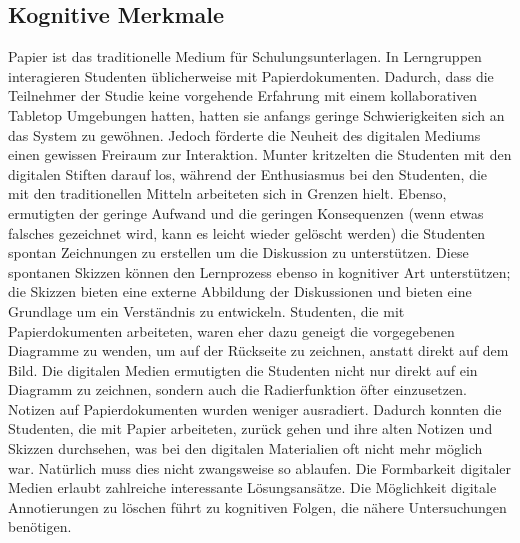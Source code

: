 \subsection{Kognitive Merkmale}
Papier ist das traditionelle Medium für Schulungsunterlagen. In Lerngruppen interagieren Studenten üblicherweise mit Papierdokumenten. Dadurch, dass die Teilnehmer der Studie keine vorgehende Erfahrung mit einem kollaborativen Tabletop Umgebungen hatten, hatten sie anfangs geringe Schwierigkeiten sich an das System zu gewöhnen. Jedoch förderte die Neuheit des digitalen Mediums einen gewissen Freiraum zur Interaktion. Munter kritzelten die Studenten mit den digitalen Stiften darauf los, während der Enthusiasmus bei den Studenten, die mit den traditionellen Mitteln arbeiteten sich in Grenzen hielt. Ebenso, ermutigten der geringe Aufwand und die geringen Konsequenzen (wenn etwas falsches gezeichnet wird, kann es leicht wieder gelöscht werden) die Studenten spontan Zeichnungen zu erstellen um die Diskussion zu unterstützen. Diese spontanen Skizzen können den Lernprozess ebenso in kognitiver Art unterstützen; die Skizzen bieten eine externe Abbildung der Diskussionen und bieten eine Grundlage um ein Verständnis zu entwickeln. Studenten, die mit Papierdokumenten arbeiteten, waren eher dazu geneigt die vorgegebenen Diagramme zu wenden, um auf der Rückseite zu zeichnen, anstatt direkt auf dem Bild. Die digitalen Medien ermutigten die Studenten nicht nur direkt auf ein Diagramm zu zeichnen, sondern auch die Radierfunktion öfter einzusetzen. Notizen auf Papierdokumenten wurden weniger ausradiert. Dadurch konnten die Studenten, die mit Papier arbeiteten, zurück gehen und ihre alten Notizen und Skizzen durchsehen, was bei den digitalen Materialien oft nicht mehr möglich war. Natürlich muss dies nicht zwangsweise so ablaufen. Die Formbarkeit digitaler Medien erlaubt zahlreiche interessante Lösungsansätze. Die Möglichkeit digitale Annotierungen zu löschen führt zu kognitiven Folgen, die nähere Untersuchungen benötigen.

